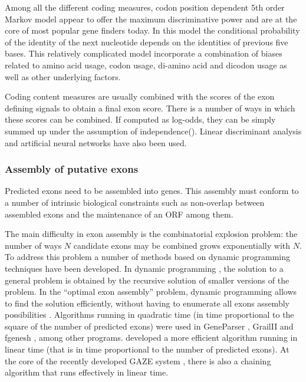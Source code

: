 Among all the different coding measures, codon position dependent 5th
order Markov model \citep{borodovsky:1993a} appear to offer the
maximum discriminative power \citep{guigo:1998a} and are at the core
of most popular gene finders today. In this model the conditional
probability of the identity of the next nucleotide depends on the
identities of previous five bases. This relatively complicated model
incorporate a combination of biases related to amino acid usage, codon
usage, di-amino acid and dicodon usage as well as other underlying
factors.

Coding content measures are usually combined with the scores of the
exon defining signals to obtain a final exon score. There is a number
of ways in which these scores can be combined. If computed as
log-odds, they can be simply summed up under the assumption of
independence(). Linear discriminant analysis \citep{solovyev:1995a}
and artificial neural networks \citep{uberbacher:1991a} have also been
used.

\subsubsection{Assembly of putative exons}

Predicted exons need to be assembled into genes. This assembly must
conform to a number of intrinsic biological constraints such as
non-overlap between assembled exons and the maintenance of an ORF
among them.

The main difficulty in exon assembly is the combinatorial explosion
problem: the number of ways $N$ candidate exons may be combined grows
exponentially with $N$. To address this problem a number of methods based
on dynamic programming techniques have been developed. In dynamic
programming \citep{bellman:1957a}, the solution to a general problem
is obtained by the recursive solution of smaller versions of the
problem. In the ``optimal exon assembly'' problem, dynamic programming
allows to find the solution efficiently, without having to enumerate
all exons assembly possibilities \citep{gelfand:1993a}. Algorithms
running in quadratic time (in time proportional to the square of the
number of predicted exons) were used in GeneParser
\citep{snyder:1993a}, GrailII \citep{xu:1994a} and fgenesh
\citep{solovyev:1995a}, among other programs. \cite{guigo:1998a}
developed a more efficient algorithm running in linear time (that is
in time proportional to the number of predicted exons). At the core of
the recently developed GAZE system \citep{howe:2002a}, there is also a
chaining algorithm that runs effectively in linear time.

